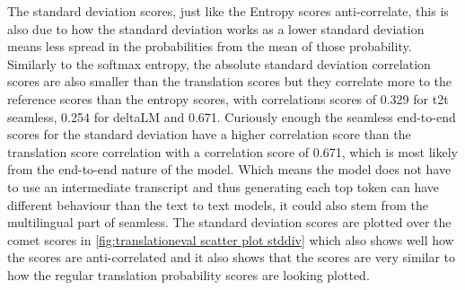The standard deviation scores, just like the Entropy scores anti-correlate, this is also due to how the standard deviation works as a lower standard deviation means less spread in the probabilities from the mean of those probability. 
Similarly to the softmax entropy, the absolute standard deviation correlation scores are also smaller than the translation scores but they correlate more to the reference scores than the entropy scores, with correlations scores of 0.329 for t2t seamless, 0.254 for deltaLM and 0.671.
Curiously enough the seamless end-to-end scores for the standard deviation have a higher correlation score than the translation score correlation with a correlation score of 0.671, which is most likely from the end-to-end nature of the model. Which means the model does not have to use an intermediate transcript and thus generating each top token can have different behaviour than the text to text models, it could also stem from the multilingual part of seamless. 
The standard deviation scores are plotted over the comet scores in \autoref{fig:translationeval scatter plot stddiv} which also shows well how the scores are anti-correlated and it also shows that the scores are very similar to how the regular translation probability scores are looking plotted. 
